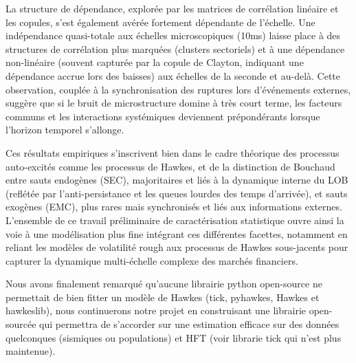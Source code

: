 \documentclass[10pt,a4paper]{article}
\theoremstyle{definition}
\theoremstyle{remark}
\begin{document}
    La structure de dépendance, explorée par les matrices de corrélation linéaire et les copules, s'est également avérée fortement dépendante de l'échelle. Une indépendance quasi-totale aux échelles microscopiques (10ms) laisse place à des structures de corrélation plus marquées (clusters sectoriels) et à une dépendance non-linéaire (souvent capturée par la copule de Clayton, indiquant une dépendance accrue lors des baisses) aux échelles de la seconde et au-delà. Cette observation, couplée à la synchronisation des ruptures lors d'événements externes, suggère que si le bruit de microstructure domine à très court terme, les facteurs communs et les interactions systémiques deviennent prépondérants lorsque l'horizon temporel s'allonge.

    \vspace{0.5cm}

    Ces résultats empiriques s'inscrivent bien dans le cadre théorique des processus auto-excités comme les processus de Hawkes, et de la distinction de Bouchaud entre sauts endogènes (SEC), majoritaires et liés à la dynamique interne du LOB (reflétée par l'anti-persistance et les queues lourdes des temps d'arrivée), et sauts exogènes (EMC), plus rares mais synchronisés et liés aux informations externes. L'ensemble de ce travail préliminaire de caractérisation statistique ouvre ainsi la voie à une modélisation plus fine intégrant ces différentes facettes, notamment en reliant les modèles de volatilité rough aux processus de Hawkes sous-jacents pour capturer la dynamique multi-échelle complexe des marchés financiers.

    \vspace{0.5cm}

    Nous avons finalement remarqué qu'aucune librairie python open-source ne permettait de bien fitter un modèle de Hawkes (tick, pyhawkes, Hawkes et hawkeslib), nous continuerons notre projet en construisant une librairie open-sourcée qui permettra de s'accorder sur une estimation efficace sur des données quelconques (sismiques ou populations) et HFT (voir librarie tick qui n'est plus maintenue).
\end{document}
